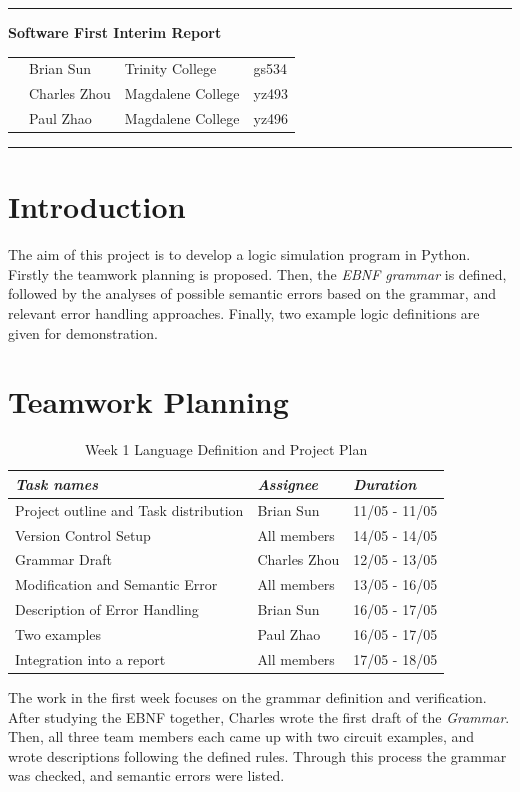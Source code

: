 \documentclass[12pt]{article}
\def\n{\noindent}
\begin{document}
\vspace{0.3cm}
\rule{15.7cm}{0.5mm}

\begin{center}
{\hspace{0.6cm}\Large \textbf {Software First Interim Report}\\
}
\end{center}
\begin{table}[H]
\centering
\begin{tabular}{ p{2cm}p{3cm}p{4cm} p{3cm}}
&Brian Sun & Trinity College & gs534 \\
&Charles Zhou & Magdalene College & yz493 \\
&Paul Zhao & Magdalene College & yz496 \\
\end{tabular}
\end{table}


\begin{center}
\rule{15.7cm}{0.5mm}
\end{center}

\section{Introduction}
\n The aim of this project is to develop a logic simulation program in Python. Firstly the teamwork planning is proposed. Then, the \textit{EBNF grammar} is defined, followed by the analyses of possible semantic errors based on the grammar, and relevant error handling approaches. Finally, two example logic definitions are given for demonstration.
\section{Teamwork Planning}
\begin{table}[H]
\begin{tabular}{p{8cm}p{4cm}p{3cm}}
\textit{Task names} & \textit{Assignee}&\textit{Duration}\\
\hline
Project outline and Task distribution & Brian Sun & 11/05 - 11/05\\
Version Control Setup & All members & 14/05 - 14/05\\
Grammar Draft 	& Charles Zhou & 12/05 - 13/05\\
Modification and Semantic Error & All members & 13/05 - 16/05\\
Description of Error Handling & Brian Sun & 16/05 - 17/05\\
Two examples & Paul Zhao & 16/05 - 17/05\\
Integration into a report & All members & 17/05 - 18/05\\
\end{tabular}
\caption{Week 1 Language Definition and Project Plan}
\end{table}
\n The work in the first week focuses on the grammar definition and verification. After studying the EBNF together, Charles wrote the first draft of the \textit{Grammar}. Then, all three team members each came up with two circuit examples, and wrote descriptions following the defined rules. Through this process the grammar was checked, and semantic errors were listed. \\
\end{document}
